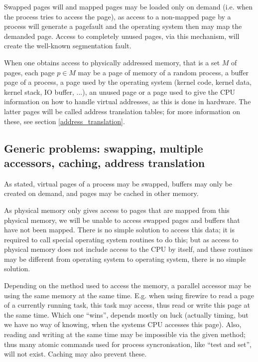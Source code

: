 Swapped pages will and mapped pages may be loaded only on demand (i.e. when the
process tries to access the page), as access to a non-mapped page by a process
will generate a pagefault and the operating system then may map the demanded
page.  Access to completely unused pages, via this mechanism, will create the
well-known segmentation fault.

When one obtains access to physically addressed memory, that is a set $M$ of
pages, each page $p \in M$ may be a page of memory of a random process, a buffer
page of a process, a page used by the operating system (kernel code, kernel
data, kernel stack, IO buffer, ...), an unused page or a page used to give the
CPU information on how to handle virtual addresses, as this is done in hardware.
The latter pages will be called address translation tables; for more information
on these, see section \ref{address_translation}.

\subsection{Generic problems: swapping, multiple accessors, caching, address
translation}

As stated, virtual pages of a process may be swapped, buffers may only be
created on demand, and pages may be cached in other memory.

As physical memory only gives access to pages that are mapped from this
physical memory, we will be unable to access swapped pages and buffers that
have not been mapped. There is no simple solution to access this data; it is
required to call special operating system routines to do this; but as access to
physical memory does not include access to the CPU by itself, and these
routines may be different from operating system to operating system, there is
no simple solution.

Depending on the method used to access the memory, a parallel accessor may be
using the same memory at the same time. E.g. when using firewire to read a page
of a currently running task, this task may access, thus read or write this page
at the same time. Which one ``wins'', depends mostly on luck (actually timing,
but we have no way of knowing, when the systems CPU accesses this page). Also,
reading and writing at the same time may be impossible via the given method;
thus many atomic commands used for process syncronisation, like ``test and
set'', will not exist.  Caching may also prevent these.

